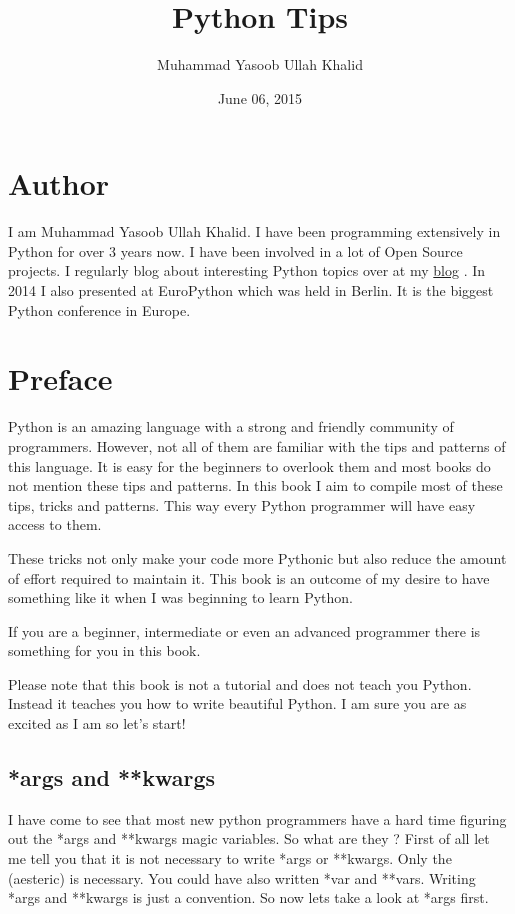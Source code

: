 \documentclass[a4paper,12pt,oneside]{sphinxmanual}
\title{Python Tips}
\date{June 06, 2015}
\author{Muhammad Yasoob Ullah Khalid}
\begin{document}
\maketitle
\tableofcontents
{}\label{index::doc}



\part{Author}
\label{index:python-tips}\label{index:author}
I am Muhammad Yasoob Ullah Khalid. I have been programming extensively in Python for over 3 years now. I have been involved in a lot of Open Source projects. I regularly blog about interesting Python topics over at my \href{http://www.freepythontips.wordpress.com}{blog} . In 2014 I also presented at EuroPython which was held in Berlin. It is the biggest Python conference in Europe.


\part{Preface}
\label{index:preface}
Python is an amazing language with a strong and friendly community of programmers. However, not all of them are familiar with the tips and patterns of this language. It is easy for the beginners to overlook them and most books do not mention these tips and patterns. In this book I aim to compile most of these tips, tricks and patterns. This way every Python programmer will have easy access to them.

These tricks not only make your code more Pythonic but also reduce the amount of effort required to maintain it. This book is an outcome of my desire to have something like it when I was beginning to learn Python.

If you are a beginner, intermediate or even an advanced programmer there is something for you in this book.

Please note that this book is not a tutorial and does not teach you Python. Instead it teaches you how to write beautiful Python. I am sure you are as excited as I am so let's start!


\chapter{*args and **kwargs}
\label{args_and_kwargs:args-and-kwargs}\label{args_and_kwargs::doc}
I have come to see that most new python programmers have a hard time
figuring out the *args and **kwargs magic variables. So what are they
? First of all let me tell you that it is not necessary to write *args
or **kwargs. Only the \code{*} (aesteric) is necessary. You could have
also written *var and **vars. Writing *args and **kwargs is just a
convention. So now lets take a look at *args first.
\end{document}
